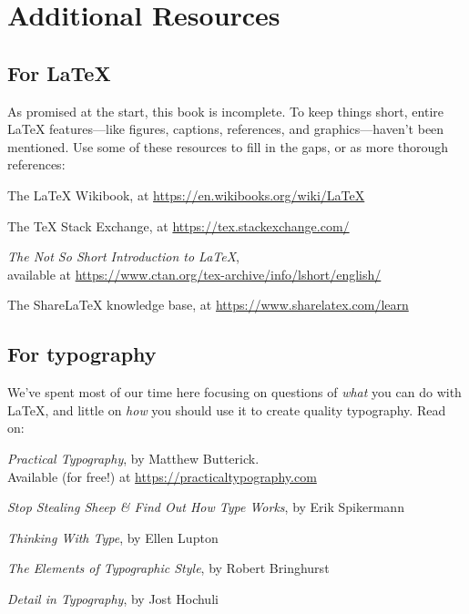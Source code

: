 \setlength\parskip{0.8\baselineskip}
\setlength\parindent{0pt}

\chapter{Additional Resources}
\label{resources}

\section{For \texorpdfstring{\LaTeX}{LaTeX}}

As promised at the start, this book is incomplete.
To keep things short,
entire \LaTeX{} features---like figures, captions, references,
and graphics---haven't been mentioned.
Use some of these resources to fill in the gaps,
or as more thorough references:

\begin{adjustwidth}{1.5em}{0pt}
The \LaTeX{} Wikibook, at \url{https://en.wikibooks.org/wiki/LaTeX}

The \TeX{} Stack Exchange, at \url{https://tex.stackexchange.com/}

\textit{The Not So Short Introduction to \LaTeX}, \\
available at \url{https://www.ctan.org/tex-archive/info/lshort/english/}

The Share\LaTeX{} knowledge base, at \url{https://www.sharelatex.com/learn}

\end{adjustwidth}

\section{For typography}

We've spent most of our time here focusing on questions of \emph{what}
you can do with \LaTeX,
and little on \emph{how} you should use it to create quality typography.
Read on:

\begin{adjustwidth}{1.5em}{0pt}
\textit{Practical Typography}, by Matthew Butterick. \\
Available (for free!) at \url{https://practicaltypography.com}

\textit{Stop Stealing Sheep \& Find Out How Type Works}, by Erik Spikermann

\textit{Thinking With Type}, by Ellen Lupton

\textit{The Elements of Typographic Style}, by Robert Bringhurst

\textit{Detail in Typography}, by Jost Hochuli
\end{adjustwidth}

